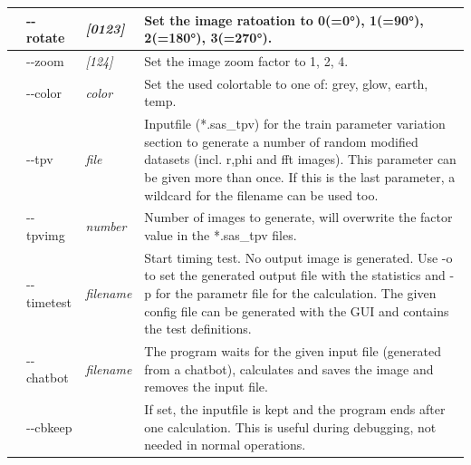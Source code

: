 \documentclass[11pt]{article} %
\begin{document}
\begin{longtable}{|L{1cm}|L{2cm}|C{2cm}|L{12cm}|}
 & -{}-rotate & {\it [0123]} & Set the image ratoation to 0(=0°), 1(=90°), 2(=180°), 3(=270°). \\ \hline
 & -{}-zoom & {\it [124]} & Set the image zoom factor to 1, 2, 4. \\ \hline
 & -{}-color & {\it color} & Set the used colortable to one of: grey, glow, earth, temp. \\ \hline
 & -{}-tpv & {\it file} & Inputfile (*.sas\_tpv) for the train parameter variation section to generate a number of random modified datasets (incl. r,phi and fft images). This parameter can be given more than once. If this is the last parameter, a wildcard for the filename can be used too. \\ \hline
 & -{}-tpvimg & {\it number} & Number of images to generate, will overwrite the factor value in the *.sas\_tpv files. \\ \hline
 & -{}-timetest & {\it filename} & Start timing test. No output image is generated. Use -o to set the generated output file with the statistics and -p for the parametr file for the calculation. The given config file can be generated with the GUI and contains the test definitions. \\ \hline
 & -{}-chatbot & {\it filename} & The program waits for the given input file (generated from a chatbot), calculates and saves the image and removes the input file. \\ \hline
 & -{}-cbkeep & & If set, the inputfile is kept and the program ends after one calculation. This is useful during debugging, not needed in normal operations. \\ \hline
\end{longtable}
\end{document}
